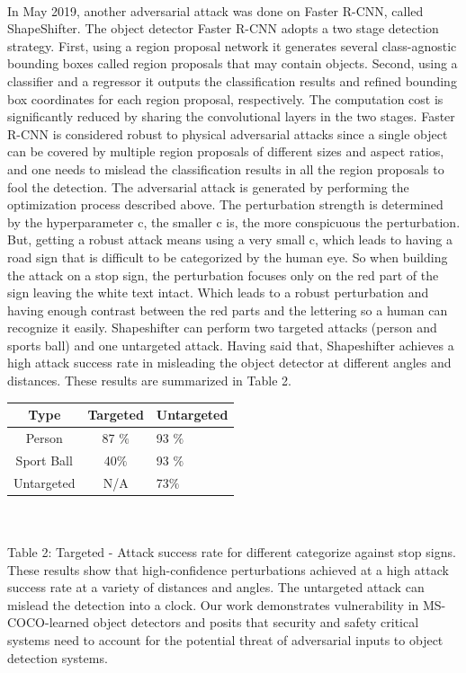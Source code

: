 \documentclass[sigconf, nonacm]{acmart}
\begin{document}
\\In May 2019, another adversarial attack was done on Faster R-CNN, called ShapeShifter\cite{Abril07}. The object detector Faster R-CNN adopts a two stage detection strategy. First, using a region proposal network it generates several class-agnostic bounding boxes called region proposals that may contain objects. Second, using a classifier and a regressor it outputs the classification results and refined bounding box coordinates for each region proposal, respectively. The computation cost is significantly reduced by sharing the convolutional layers in the two stages. Faster R-CNN is considered robust to physical adversarial attacks since a single object can be covered by multiple region proposals of different sizes and aspect ratios, and one needs to mislead the classification results in all the region proposals to fool the detection. The adversarial attack is generated by performing the optimization process described above. The perturbation strength is determined by the hyperparameter c, the smaller c is, the more conspicuous the perturbation. But, getting a robust attack means using a very small c, which leads to having a road sign that is difficult to be categorized by the human eye.  So when building the attack on a stop sign, the perturbation focuses only on the red part of the sign leaving the white text intact. Which leads to a robust perturbation and having enough contrast between the red parts and the lettering so a human can recognize it easily. Shapeshifter can perform two targeted attacks (person and sports ball) and one untargeted attack. Having said that, Shapeshifter achieves a high attack success rate in misleading the object detector at different angles and distances. These results are summarized in  Table 2. 
\begin{table}[hb]%
  \label{tab:freq}
  \begin{tabular}{ccl}
    \toprule
    Type & Targeted & Untargeted\\
    \midrule
    Person & 87 $\%$ & 93 $\%$ \\
    Sport Ball & 40$\%$ & 93 $\%$\\
    Untargeted & N/A & 73$\%$\\
  \bottomrule
\end{tabular}
\end{table}
\\
\\Table 2: Targeted - Attack success rate for different categorize against stop signs. 
\\
These results show that high-confidence perturbations achieved at a high attack success rate at a variety of distances and angles. The untargeted attack can mislead the detection into a clock. 
Our work demonstrates vulnerability in MS-COCO-learned object detectors and posits that security and safety critical systems need to account for the potential threat of adversarial inputs to object detection systems.
\end{document}
